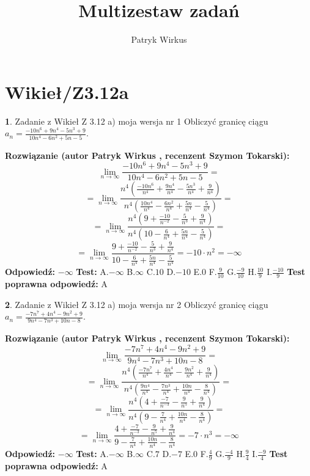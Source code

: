 \documentclass[12pt, a4paper]{article}
\title{Multizestaw zadań}
\author{Patryk Wirkus}
\date{}
\theoremstyle{definition} %
\newtheorem{zad}{}
\newcommand{\kategoria}[1]{\section{#1}}
\newcommand{\zadStart}[1]{\begin{zad}#1\newline}
\newcommand{\zadStop}{\end{zad}}
\newcommand{\rozwStart}[2]{\noindent \textbf{Rozwiązanie (autor #1 , recenzent #2): }\newline}
\newcommand{\rozwStop}{\newline}
\newcommand{\odpStart}{\noindent \textbf{Odpowiedź:}\newline}
\newcommand{\odpStop}{\newline}
\newcommand{\testStart}{\noindent \textbf{Test:}\newline}
\newcommand{\testStop}{\newline}
\newcommand{\kluczStart}{\noindent \textbf{Test poprawna odpowiedź:}\newline}
\newcommand{\kluczStop}{\newline}
\begin{document}
\maketitle

\kategoria{Wikieł/Z3.12a}


\zadStart{Zadanie z Wikieł Z 3.12 a) moja wersja nr 1}
Obliczyć granicę ciągu $a_{n}=\frac{-10n^{6}+9n^{4}-5n^{3}+9}{10n^{4}-6n^{2}+5n-5}$.
\zadStop
\rozwStart{Patryk Wirkus}{Szymon Tokarski}
$$\lim\limits_{n\to\infty}\frac{-10n^{6}+9n^{4}-5n^{3}+9}{10n^{4}-6n^{2}+5n-5}=$$
$$=\lim\limits_{n\to\infty}\frac{n^{4}\left(\frac{-10n^{6}}{n^{4}}+\frac{9n^{4}}{n^{4}}-\frac{5n^{3}}{n^{4}}+\frac{9}{n^{4}}\right)}{n^{4}\left(\frac{10n^{4}}{n^{4}}-\frac{6n^{2}}{n^{4}}+\frac{5n}{n^{4}}-\frac{5}{n^{4}}\right)}=$$
$$=\lim\limits_{n\to\infty}\frac{n^{4}\left(9+\frac{-10}{n^{-2}}-\frac{5}{n^{3}}+\frac{9}{n^{4}}\right)}
{n^{4}\left(10-\frac{6}{n^{4}}+\frac{5n}{n^{4}}-\frac{5}{n^{4}}\right)}=$$
$$=\lim\limits_{n\to\infty}\frac{9+\frac{-10}{n^{-2}}-\frac{5}{n^{3}}+\frac{9}{n^{4}}}{10-\frac{6}{n^{4}}+\frac{5n}{n^{4}}-\frac{5}{n^{4}}}=-10\cdot n^{2} = -\infty$$
\rozwStop
\odpStart
$-\infty$
\odpStop
\testStart
A.$-\infty$
B.$\infty$
C.$10$
D.$-10$
E.$0$
F.$\frac{9}{10}$
G.$\frac{-9}{10}$
H.$\frac{10}{9}$
I.$\frac{-10}{9}$
\testStop
\kluczStart
A
\kluczStop



\zadStart{Zadanie z Wikieł Z 3.12 a) moja wersja nr 2}
Obliczyć granicę ciągu $a_{n}=\frac{-7n^{7}+4n^{4}-9n^{2}+9}{9n^{4}-7n^{3}+10n-8}$.
\zadStop
\rozwStart{Patryk Wirkus}{Szymon Tokarski}
$$\lim\limits_{n\to\infty}\frac{-7n^{7}+4n^{4}-9n^{2}+9}{9n^{4}-7n^{3}+10n-8}=$$
$$=\lim\limits_{n\to\infty}\frac{n^{4}\left(\frac{-7n^{7}}{n^{4}}+\frac{4n^{4}}{n^{4}}-\frac{9n^{2}}{n^{4}}+\frac{9}{n^{4}}\right)}{n^{4}\left(\frac{9n^{4}}{n^{4}}-\frac{7n^{3}}{n^{4}}+\frac{10n}{n^{4}}-\frac{8}{n^{4}}\right)}=$$
$$=\lim\limits_{n\to\infty}\frac{n^{4}\left(4+\frac{-7}{n^{-3}}-\frac{9}{n^{5}}+\frac{9}{n^{4}}\right)}
{n^{4}\left(9-\frac{7}{n^{4}}+\frac{10n}{n^{4}}-\frac{8}{n^{4}}\right)}=$$
$$=\lim\limits_{n\to\infty}\frac{4+\frac{-7}{n^{-3}}-\frac{9}{n^{5}}+\frac{9}{n^{4}}}{9-\frac{7}{n^{4}}+\frac{10n}{n^{4}}-\frac{8}{n^{4}}}=-7\cdot n^{3} = -\infty$$
\rozwStop
\odpStart
$-\infty$
\odpStop
\testStart
A.$-\infty$
B.$\infty$
C.$7$
D.$-7$
E.$0$
F.$\frac{4}{9}$
G.$\frac{-4}{9}$
H.$\frac{9}{4}$
I.$\frac{-9}{4}$
\testStop
\kluczStart
A
\kluczStop
\end{document}
